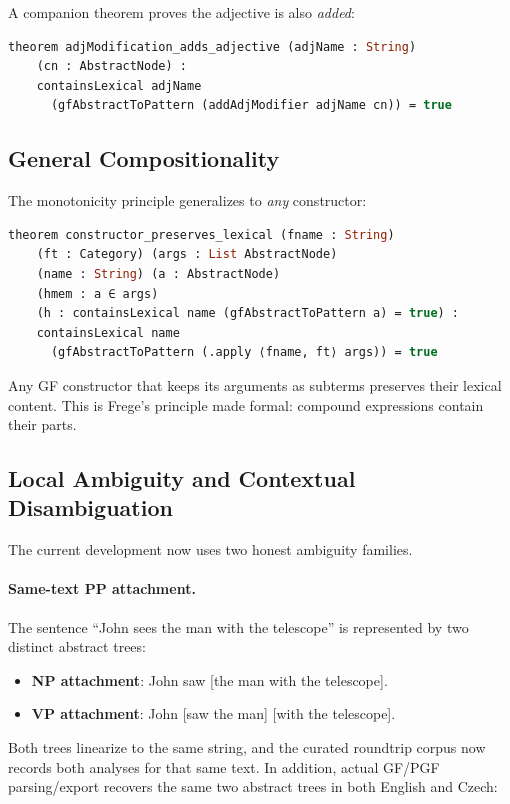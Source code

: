 \documentclass[11pt]{article}
\newcommand{\GF}{\textup{GF}}
\begin{document}
A companion theorem proves the adjective is also \emph{added}:

\begin{lstlisting}[language=ml]
theorem adjModification_adds_adjective (adjName : String)
    (cn : AbstractNode) :
    containsLexical adjName
      (gfAbstractToPattern (addAdjModifier adjName cn)) = true
\end{lstlisting}

\subsection{General Compositionality}

The monotonicity principle generalizes to \emph{any} constructor:

\begin{lstlisting}[language=ml,caption={General compositionality}]
theorem constructor_preserves_lexical (fname : String)
    (ft : Category) (args : List AbstractNode)
    (name : String) (a : AbstractNode)
    (hmem : a ∈ args)
    (h : containsLexical name (gfAbstractToPattern a) = true) :
    containsLexical name
      (gfAbstractToPattern (.apply ⟨fname, ft⟩ args)) = true
\end{lstlisting}

Any \GF{} constructor that keeps its arguments as subterms preserves
their lexical content.  This is Frege's principle made formal: compound
expressions contain their parts.

\subsection{Local Ambiguity and Contextual Disambiguation}

The current development now uses two honest ambiguity families.

\paragraph{Same-text PP attachment.}
The sentence ``John sees the man with the telescope'' is represented by two
distinct abstract trees:
\begin{itemize}
\item \textbf{NP attachment}: John saw [the man with the telescope].
\item \textbf{VP attachment}: John [saw the man] [with the telescope].
\end{itemize}
Both trees linearize to the same string, and the curated roundtrip corpus now
records both analyses for that same text.  In addition, actual \GF{}/PGF
parsing/export recovers the same two abstract trees in both English and Czech:
\end{document}
